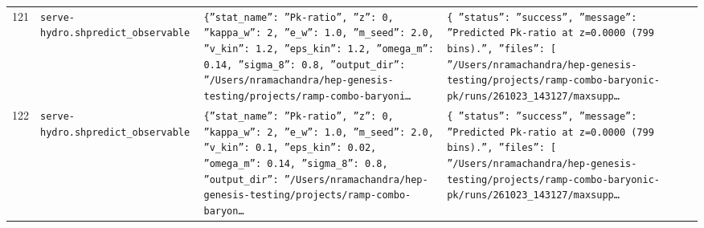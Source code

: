 \documentclass[11pt,a4paper]{article}
\begin{document}
\begin{longtable}{@{}p{}p{}p{}p{}@{}}
121 & \texttt{serve-hydro.sh}\newline\texttt{predict\_\allowbreak{}observable} & \texttt{\{''stat\_\allowbreak{}name'':\allowbreak{} ''Pk-ratio'',\allowbreak{} ''z'':\allowbreak{} 0,\allowbreak{} ''kappa\_\allowbreak{}w'':\allowbreak{} 2,\allowbreak{} ''e\_\allowbreak{}w'':\allowbreak{} 1.0,\allowbreak{} ''m\_\allowbreak{}seed'':\allowbreak{} 2.0,\allowbreak{} ''v\_\allowbreak{}kin'':\allowbreak{} 1.2,\allowbreak{} ''eps\_\allowbreak{}kin'':\allowbreak{} 1.2,\allowbreak{} ''omega\_\allowbreak{}m'':\allowbreak{} 0.14,\allowbreak{} ''sigma\_\allowbreak{}8'':\allowbreak{} 0.8,\allowbreak{} ''output\_\allowbreak{}dir'':\allowbreak{} ''/\allowbreak{}Users/\allowbreak{}nramachandra/\allowbreak{}hep-genesis-testing/\allowbreak{}projects/\allowbreak{}ramp-combo-baryoni\ldots{}\allowbreak{}} & \texttt{\{   ''status'':\allowbreak{} ''success'',\allowbreak{}   ''message'':\allowbreak{} ''Predicted Pk-ratio at z=\allowbreak{}0.0000 (799 bins)\allowbreak{}.'',\allowbreak{}   ''files'':\allowbreak{} [     ''/\allowbreak{}Users/\allowbreak{}nramachandra/\allowbreak{}hep-genesis-testing/\allowbreak{}projects/\allowbreak{}ramp-combo-baryonic-pk/\allowbreak{}runs/\allowbreak{}261023\_\allowbreak{}143127/\allowbreak{}maxsupp\ldots{}\allowbreak{}} \\
122 & \texttt{serve-hydro.sh}\newline\texttt{predict\_\allowbreak{}observable} & \texttt{\{''stat\_\allowbreak{}name'':\allowbreak{} ''Pk-ratio'',\allowbreak{} ''z'':\allowbreak{} 0,\allowbreak{} ''kappa\_\allowbreak{}w'':\allowbreak{} 2,\allowbreak{} ''e\_\allowbreak{}w'':\allowbreak{} 1.0,\allowbreak{} ''m\_\allowbreak{}seed'':\allowbreak{} 2.0,\allowbreak{} ''v\_\allowbreak{}kin'':\allowbreak{} 0.1,\allowbreak{} ''eps\_\allowbreak{}kin'':\allowbreak{} 0.02,\allowbreak{} ''omega\_\allowbreak{}m'':\allowbreak{} 0.14,\allowbreak{} ''sigma\_\allowbreak{}8'':\allowbreak{} 0.8,\allowbreak{} ''output\_\allowbreak{}dir'':\allowbreak{} ''/\allowbreak{}Users/\allowbreak{}nramachandra/\allowbreak{}hep-genesis-testing/\allowbreak{}projects/\allowbreak{}ramp-combo-baryon\ldots{}\allowbreak{}} & \texttt{\{   ''status'':\allowbreak{} ''success'',\allowbreak{}   ''message'':\allowbreak{} ''Predicted Pk-ratio at z=\allowbreak{}0.0000 (799 bins)\allowbreak{}.'',\allowbreak{}   ''files'':\allowbreak{} [     ''/\allowbreak{}Users/\allowbreak{}nramachandra/\allowbreak{}hep-genesis-testing/\allowbreak{}projects/\allowbreak{}ramp-combo-baryonic-pk/\allowbreak{}runs/\allowbreak{}261023\_\allowbreak{}143127/\allowbreak{}maxsupp\ldots{}\allowbreak{}} \\

\end{longtable}
\end{document}
